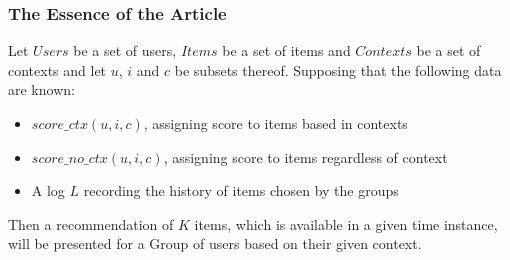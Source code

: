 \begin{frame}
	\frametitle{The Essence of the Article}
	Let $Users$ be a set of users, $Items$ be a set of items and $Contexts$ be a set of contexts and let $u$, $i$ and $c$ be subsets thereof. Supposing that the following data are known: 
	\begin{itemize}
		\item $score\_ctx(u,i,c)$, assigning score to items based in contexts
		\item $score\_no\_ctx(u,i,c)$, assigning score to items regardless of context
		\item A log $L$ recording the history of items chosen by the groups
	\end{itemize}	 
	Then a recommendation of $K$ items, which is available in a given time instance, will be presented for a Group of users based on their given context. 
	
\end{frame}